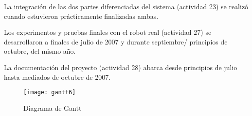 La integración de las dos partes diferenciadas del sistema (actividad 23) se realizó cuando estuvieron prácticamente finalizadas ambas.

Los experimentos y pruebas finales con el robot real (actividad 27) se desarrollaron a finales de julio de 2007 y durante septiembre/ principios de octubre, del mismo año.

La documentación del proyecto (actividad 28) abarca desde principios de julio hasta mediados de octubre de 2007.

\clearpage
\begin{figure}
  \centering\texttt{[image: gantt6]}\\
  \caption{Diagrama de Gantt}\label{gantt}
\end{figure}
